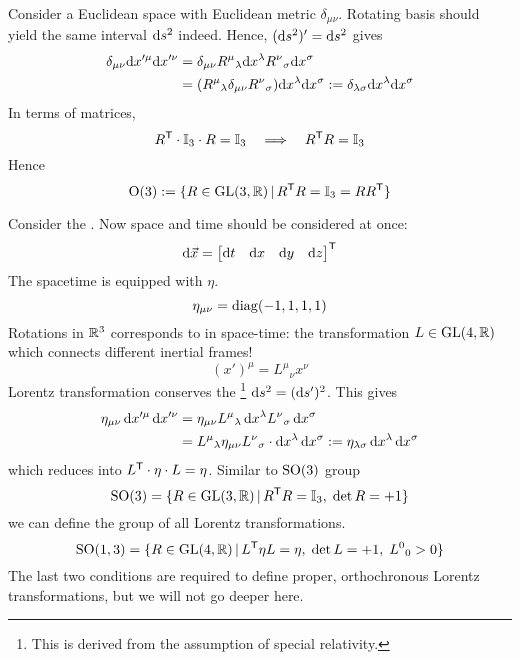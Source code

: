 \documentclass[a4paper, 10pt]{article}
\begin{document}
\begin{obs}
    Consider a Euclidean space with Euclidean metric $\delta_{\mu\nu}$. Rotating basis should yield the same interval $\mathrm{d} s^{2}$ indeed. Hence, $(\mathrm{d} s^{2})' = \mathrm{d} s^{2}$ gives
    \begin{align*}
        \delta_{\mu\nu} \mathrm{d} x'^{\mu} \mathrm{d} x'^{\nu} &= \delta_{\mu\nu} R^{\mu}{}_{\lambda} \mathrm{d} x^{\lambda} R^{\nu}{}_{\sigma} \mathrm{d} x^{\sigma} \\
    &= (R^{\mu}{}_{\lambda}\delta_{\mu\nu}R^{\nu}{}_{\sigma})\mathrm{d} x^{\lambda} \mathrm{d} x^{\sigma} := \delta_{\lambda\sigma}\mathrm{d} x^{\lambda} \mathrm{d} x^{\sigma}
    \end{align*}
    In terms of matrices,
    \[ R^{\mathsf{T}} \cdot \mathbb{I}_{3} \cdot R = \mathbb{I}_{3} \quad \Longrightarrow \quad R^{\mathsf{T}}R = \mathbb{I}_{3} \]
    Hence
    \[ \mathrm{O}(3) := \{ R \in \mathrm{GL}(3, \mathbb{R}) \,|\, R^{\mathsf{T}}R = \mathbb{I}_{3} = RR^{\mathsf{T}} \} \]
\end{obs}
\newpage


\begin{obs}
    Consider the . Now space and time should be considered at once:
    \[ \mathrm{d}\vec{x} = \begin{bmatrix}\mathrm{d} t & \mathrm{d} x & \mathrm{d} y & \mathrm{d} z\end{bmatrix}^{\mathsf{T}} \]
    The spacetime is equipped with  $\eta$.
    \[ \eta_{\mu\nu} = \mathrm{diag}(-1,1,1,1) \]
    Rotations in $\mathbb{R}^{3}$ corresponds to  in space-time: the transformation $L \in \mathrm{GL}(4, \mathbb{R})$ which connects different inertial frames!
    \[ (x')^{\mu} = L^{\mu}{}_{\nu} x^{\nu} \]
    Lorentz transformation conserves the \footnote{This is derived from the assumption of special relativity.} $\mathrm{d}{s}^{2} = (\mathrm{d}{s}')^{2}$. This gives
    \begin{align*}
        \eta_{\mu\nu} \, \mathrm{d}{x}'^{\mu} \, \mathrm{d}{x}'^{\nu} &= \eta_{\mu\nu}L^{\mu}{}_{\lambda} \,\mathrm{d}{x}^{\lambda} L^{\nu}{}_{\sigma} \,\mathrm{d}{x}^{\sigma} \\
        &= L^{\mu}{}_{\lambda}\eta_{\mu\nu}L^{\nu}{}_{\sigma} \cdot \mathrm{d}{x}^{\lambda} \,\mathrm{d}{x}^{\sigma} := \eta_{\lambda\sigma} \,\mathrm{d}{x}^{\lambda} \,\mathrm{d}{x}^{\sigma}
    \end{align*}
    which reduces into $L^{\mathsf{T}}\cdot\eta\cdot L = \eta$. Similar to $\mathrm{SO(3)}$ group
    \[ \mathrm{SO}(3) = \{ R \in \mathrm{GL}(3, \mathbb{R}) \,|\, R^{\mathsf{T}}R = \mathbb{I}_{3}, \; \det{R} = +1 \} \]
    we can define the group of all Lorentz transformations.
    \[ \mathrm{SO(1,3)} = \{ R \in \mathrm{GL}(4, \mathbb{R}) \,|\, L^{\mathsf{T}}\eta L = \eta, \; \det{L} = +1, \; L^{0}{}_{0} > 0 \} \]
    The last two conditions are required to define proper, orthochronous Lorentz transformations, but we will not go deeper here.
\end{obs}
\newpage
\end{document}
